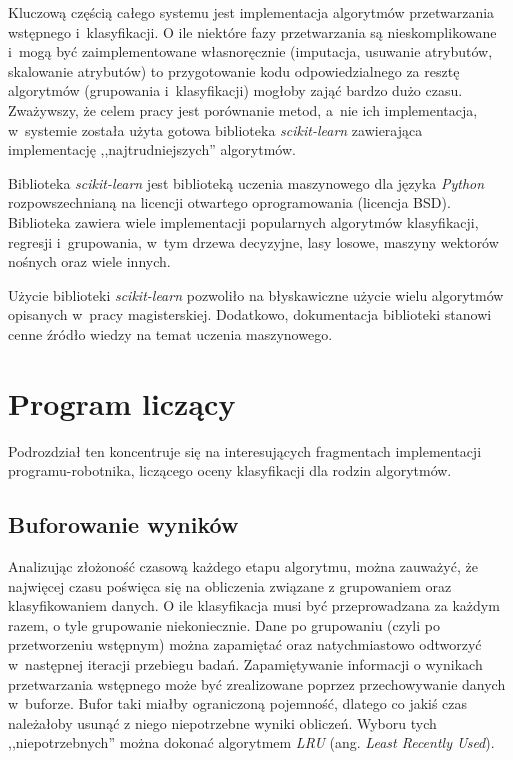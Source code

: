 \documentclass[../thesis.tex]{subfiles}
\begin{document}
Kluczową częścią całego systemu jest implementacja algorytmów przetwarzania wstępnego i~klasyfikacji. O ile niektóre fazy przetwarzania są nieskomplikowane i~mogą być zaimplementowane własnoręcznie (imputacja, usuwanie atrybutów, skalowanie atrybutów) to przygotowanie kodu odpowiedzialnego za resztę algorytmów (grupowania i~klasyfikacji) mogłoby zająć bardzo dużo czasu. Zważywszy, że celem pracy jest porównanie metod, a~nie ich implementacja, w~systemie została użyta gotowa biblioteka \emph{scikit-learn} zawierająca implementację ,,najtrudniejszych'' algorytmów.

Biblioteka \emph{scikit-learn} jest biblioteką uczenia maszynowego dla języka \emph{Python} rozpowszechnianą na licencji otwartego oprogramowania (licencja BSD). Biblioteka zawiera wiele implementacji popularnych algorytmów klasyfikacji, regresji i~grupowania, w~tym drzewa decyzyjne, lasy losowe, maszyny wektorów nośnych oraz wiele innych.

Użycie biblioteki \emph{scikit-learn} pozwoliło na błyskawiczne użycie wielu algorytmów opisanych w~pracy magisterskiej. Dodatkowo, dokumentacja biblioteki stanowi cenne źródło wiedzy na temat uczenia maszynowego.

\section{Program liczący}

Podrozdział ten koncentruje się na interesujących fragmentach implementacji programu-robotnika, liczącego oceny klasyfikacji dla rodzin algorytmów.

\subsection{Buforowanie wyników}
\label{impl:opt}

Analizując złożoność czasową każdego etapu algorytmu, można zauważyć, że najwięcej czasu poświęca się na obliczenia związane z grupowaniem oraz klasyfikowaniem danych. O ile klasyfikacja musi być przeprowadzana za każdym razem, o tyle grupowanie niekoniecznie. Dane po grupowaniu (czyli po przetworzeniu wstępnym) można zapamiętać oraz natychmiastowo odtworzyć w~następnej iteracji przebiegu badań. Zapamiętywanie informacji o wynikach przetwarzania wstępnego może być zrealizowane poprzez przechowywanie danych w~buforze. Bufor taki miałby ograniczoną pojemność, dlatego co jakiś czas należałoby usunąć z niego niepotrzebne wyniki obliczeń. Wyboru tych ,,niepotrzebnych'' można dokonać algorytmem \emph{LRU} (ang. \emph{Least Recently Used}).
\end{document}
